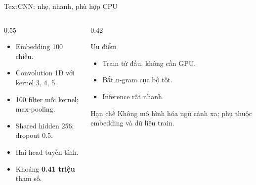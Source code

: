 \documentclass[aspectratio=169,11pt]{beamer}
\newcommand{\good}[1]{\textcolor{sgublue}{\textbf{#1}}}
\begin{document}
\begin{frame}{TextCNN: nhẹ, nhanh, phù hợp CPU}
\begin{columns}[T]
\begin{column}{0.55\textwidth}
\begin{itemize}
  \item Embedding 100 chiều.
  \item Convolution 1D với kernel 3, 4, 5.
  \item 100 filter mỗi kernel; max-pooling.
  \item Shared hidden 256; dropout 0.5.
  \item Hai head tuyến tính.
  \item Khoảng \good{0.41 triệu} tham số.
\end{itemize}
\end{column}
\begin{column}{0.42\textwidth}
\begin{block}{Ưu điểm}
\begin{itemize}
  \item Train từ đầu, không cần GPU.
  \item Bắt n-gram cục bộ tốt.
  \item Inference rất nhanh.
\end{itemize}
\end{block}
\begin{alertblock}{Hạn chế}
Không mô hình hóa ngữ cảnh xa; phụ thuộc embedding và dữ liệu train.
\end{alertblock}
\end{column}
\end{columns}
\end{frame}
\end{document}
